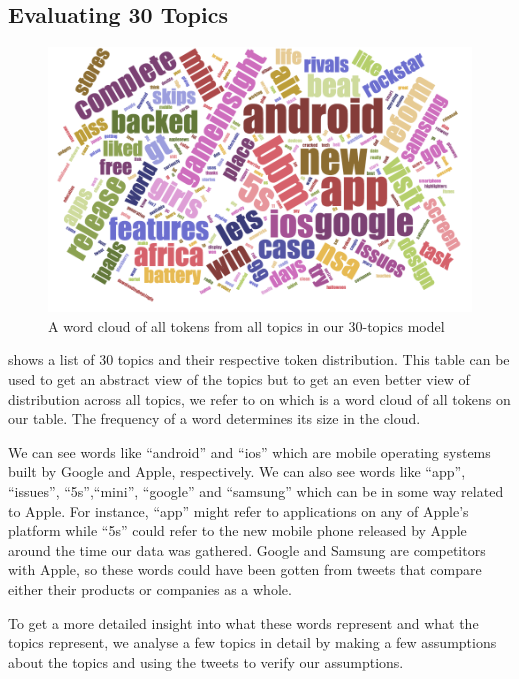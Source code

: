 \subsection{Evaluating 30 Topics}
\label{sec:evaluating-30-topics}
\begin{figure}
\begin{center}
  \includegraphics[scale=0.75,angle=90]{Figures/30_topics_cloud}
\end{center}
\caption{A word cloud of all tokens from all topics in our 30-topics model}
\label{fig:30-topics-cloud}
\end{figure}

 shows a list of 30 topics and their respective token distribution. This
table can be used to get an abstract view of the topics but to get an even better view of
distribution across all topics, we refer to  on
 which is a word cloud of all tokens on our table. The frequency of a
word determines its size in the cloud.

We can see words like ``android'' and ``ios'' which are mobile operating systems built by Google and
Apple, respectively. We can also see words like ``app'', ``issues'', ``5s'',``mini'', ``google'' and
``samsung'' which can be in some way related to Apple. For instance, ``app'' might refer to
applications on any of Apple's platform while ``5s'' could refer to the new mobile phone released by
Apple around the time our data was gathered. Google and Samsung are competitors with Apple, so these
words could have been gotten from tweets that compare either their products or companies as a
whole.

To get a more detailed insight into what these words represent and what the topics represent, we
analyse a few topics in detail by making a few assumptions about the topics and using the tweets to
verify our assumptions.\\


